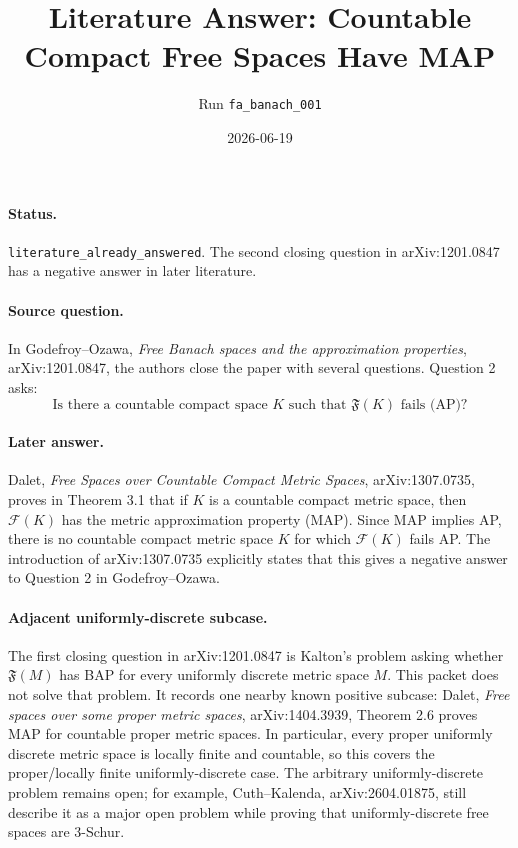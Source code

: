 \documentclass[11pt]{article}
\title{Literature Answer: Countable Compact Free Spaces Have MAP}
\author{Run \texttt{fa\_banach\_001}}
\date{2026-06-19}
\begin{document}
\maketitle

\paragraph{Status.}
\texttt{literature\_already\_answered}.  The second closing question in
arXiv:1201.0847 has a negative answer in later literature.

\paragraph{Source question.}
In Godefroy--Ozawa, \emph{Free Banach spaces and the approximation properties},
arXiv:1201.0847, the authors close the paper with several questions.  Question
2 asks:
\[
  \text{Is there a countable compact space }K
  \text{ such that }\mathfrak F(K)\text{ fails (AP)?}
\]

\paragraph{Later answer.}
Dalet, \emph{Free Spaces over Countable Compact Metric Spaces},
arXiv:1307.0735, proves in Theorem 3.1 that if \(K\) is a countable compact
metric space, then \(\mathcal F(K)\) has the metric approximation property
(MAP).  Since MAP implies AP, there is no countable compact metric space
\(K\) for which \(\mathcal F(K)\) fails AP.  The introduction of
arXiv:1307.0735 explicitly states that this gives a negative answer to
Question 2 in Godefroy--Ozawa.

\paragraph{Adjacent uniformly-discrete subcase.}
The first closing question in arXiv:1201.0847 is Kalton's problem asking
whether \(\mathfrak F(M)\) has BAP for every uniformly discrete metric space
\(M\).  This packet does not solve that problem.  It records one nearby known
positive subcase: Dalet, \emph{Free spaces over some proper metric spaces},
arXiv:1404.3939, Theorem 2.6 proves MAP for countable proper metric spaces.
In particular, every proper uniformly discrete metric space is locally finite
and countable, so this covers the proper/locally finite uniformly-discrete
case.  The arbitrary uniformly-discrete problem remains open; for example,
Cuth--Kalenda, arXiv:2604.01875, still describe it as a major open problem
while proving that uniformly-discrete free spaces are \(3\)-Schur.
\end{document}
